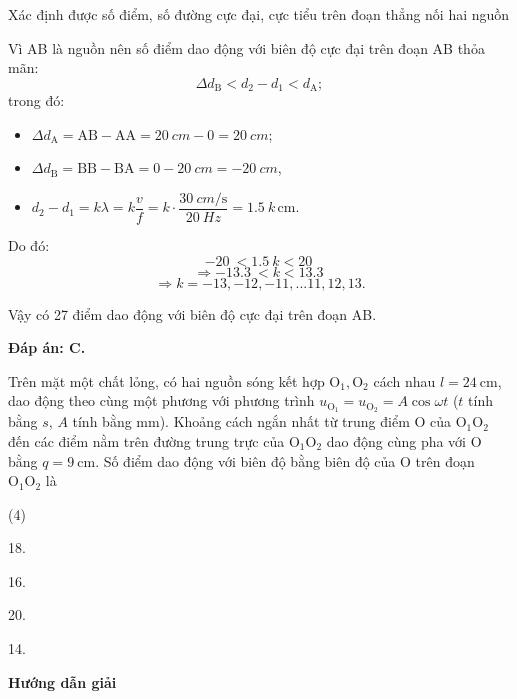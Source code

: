 \begin{dang}{Xác định được số điểm, số đường cực đại, cực tiểu trên đoạn thẳng nối hai nguồn}
{		Vì AB là nguồn nên số điểm dao động với biên độ cực đại trên đoạn AB thỏa mãn:
		$$\Delta d_\text{B}< {d_2}-{d_1}< d_\text{A};$$
		trong đó:
		\begin{itemize}
			\item
			$ \Delta d_\text{A}=\text{AB}-\text{AA}=\SI{20}{cm}-0=\SI{20}{cm}$;
			\item
			$ \Delta d_\text{B}=\text{BB}-\text{BA}=0-\SI{20}{cm}=-\SI{20}{cm}$,
			\item
			$d_2-d_1=k\lambda=k\dfrac{v}{f}=k\cdot\dfrac{\SI{30}{cm/\second}}{\SI{20}{Hz}}=\SI{1.5}{}k\,\text{cm}$.
		\end{itemize}
		
		Do đó:
		$$ -\SI{20}{}<\SI{1.5}{}k< \SI{20}{}$$ $$\Rightarrow -\SI{13.3}{}< k < \SI{13.3}{}$$  $$\Rightarrow k= -13,-12,-11,... 11,12,13.$$
		
		Vậy có 27 điểm dao động với biên độ cực đại trên đoạn AB.
		
		\textbf{Đáp án: C.}
	}
	{
		Trên mặt một chất lỏng, có hai nguồn sóng kết hợp $\text{O}_1, \text{O}_2$ cách nhau $l=24\ \text{cm}$, dao động theo cùng một phương với phương trình $u_{\text{O}_1}=u_{\text{O}_2} = A \cos \omega t $ ($t$ tính bằng $s$, $A$ tính bằng $\text{mm}$). Khoảng cách ngắn nhất từ trung điểm O của $\text{O}_1 \text{O}_2$ đến các điểm nằm trên đường trung trực của $\text{O}_1\text{O}_2$ dao động cùng pha với O bằng $q=9\ \text{cm}$. Số điểm dao động với biên độ bằng biên độ của O trên đoạn $\text{O}_1\text{O}_2$ là
		\begin{mcq}(4)
			\item 18.
			\item 16.
			\item 20.
			\item 14.
		\end{mcq}
	}{
		\begin{center}
			\textbf{Hướng dẫn giải}
			

\end{center}}
\end{dang}
